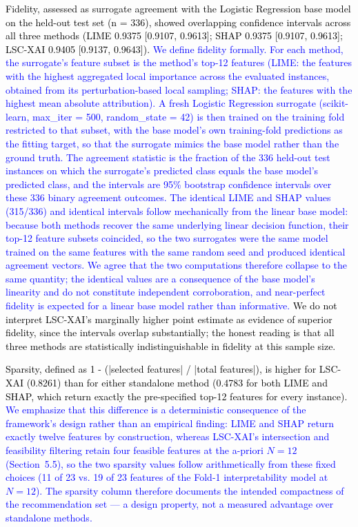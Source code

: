\documentclass[a4paper,fleqn]{cas-sc}
\begin{document}
\textcolor{black}{Fidelity, assessed as surrogate agreement with the Logistic Regression base model on the held-out test set (n = 336), showed overlapping confidence intervals across all three methods (LIME 0.9375 [0.9107, 0.9613]; SHAP 0.9375 [0.9107, 0.9613]; LSC-XAI 0.9405 [0.9137, 0.9643]). \textcolor{blue}{We define fidelity formally. For each method, the surrogate's feature subset is the method's top-12 features (LIME: the features with the highest aggregated local importance across the evaluated instances, obtained from its perturbation-based local sampling; SHAP: the features with the highest mean absolute attribution). A fresh Logistic Regression surrogate (scikit-learn, max\_iter = 500, random\_state = 42) is then trained on the training fold restricted to that subset, with the base model's own training-fold predictions as the fitting target, so that the surrogate mimics the base model rather than the ground truth. The agreement statistic is the fraction of the 336 held-out test instances on which the surrogate's predicted class equals the base model's predicted class, and the intervals are 95\% bootstrap confidence intervals over these 336 binary agreement outcomes. The identical LIME and SHAP values (315/336) and identical intervals follow mechanically from the linear base model: because both methods recover the same underlying linear decision function, their top-12 feature subsets coincided, so the two surrogates were the same model trained on the same features with the same random seed and produced identical agreement vectors. We agree that the two computations therefore collapse to the same quantity; the identical values are a consequence of the base model's linearity and do not constitute independent corroboration, and near-perfect fidelity is expected for a linear base model rather than informative.} We do not interpret LSC-XAI's marginally higher point estimate as evidence of superior fidelity, since the intervals overlap substantially; the honest reading is that all three methods are statistically indistinguishable in fidelity at this sample size.}

\textcolor{black}{Sparsity, defined as 1 - (|selected features| / |total features|), is higher for LSC-XAI (0.8261) than for either standalone method (0.4783 for both LIME and SHAP, which return exactly the pre-specified top-12 features for every instance). \textcolor{blue}{We emphasize that this difference is a deterministic consequence of the framework's design rather than an empirical finding: LIME and SHAP return exactly twelve features by construction, whereas LSC-XAI's intersection and feasibility filtering retain four feasible features at the a-priori $N = 12$ (Section~5.5), so the two sparsity values follow arithmetically from these fixed choices (11 of 23 vs. 19 of 23 features of the Fold-1 interpretability model at $N = 12$). The sparsity column therefore documents the intended compactness of the recommendation set — a design property, not a measured advantage over standalone methods.}}
\end{document}
